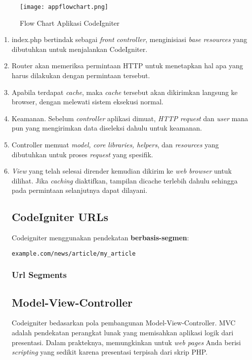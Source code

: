 \begin{figure} [H]
	\centering  
	\texttt{[image: appflowchart.png]}  
	\caption{Flow Chart Aplikasi CodeIgniter}
	\label{fig:flow-chart-CodeIgniter} 
\end{figure}

\begin{enumerate}
\item index.php bertindak sebagai \textit{front controller}, menginisiasi \textit{base resources} yang dibutuhkan untuk menjalankan CodeIgniter.
\item Router akan memeriksa permintaan HTTP untuk menetapkan hal apa yang harus dilakukan dengan permintaan tersebut.
\item Apabila terdapat \textit{cache}, maka \textit{cache} tersebut akan dikirimkan langsung ke browser, dengan melewati sistem eksekusi normal.
\item Keamanan. Sebelum \textit{controller} aplikasi dimuat, \textit{HTTP request} dan \textit{user} mana pun yang mengirimkan data diseleksi dahulu untuk keamanan.
\item Controller memuat \textit{model, core libraries, helpers}, dan \textit{resources} yang dibutuhkan untuk proses \textit{request} yang spesifik.
\item \textit{View} yang telah selesai dirender kemudian dikirim ke \textit{web browser} untuk dilihat. Jika \textit{caching} diaktifkan, tampilan dicache terlebih dahulu sehingga pada permintaan selanjutnya dapat dilayani.\citep{codeIgniter:17}

\subsection{CodeIgniter URLs}
\label{subs:urls}
Codeigniter menggunakan pendekatan \textbf{berbasis-segmen}:\cite{codeigniter:17}
\begin{lstlisting}[frame=single] 
example.com/news/article/my_article
\end{lstlisting}

\subsubsection{Url Segments}
\label{sssec:url_1}


\subsection{Model-View-Controller}
\label{subs:mvc}
Codeigniter bedasarkan pola pembangunan Model-View-Controller. MVC adalah pendekatan perangkat lunak yang memisahkan aplikasi logik dari presentasi. Dalam prakteknya, memungkinkan untuk \textit{web pages} Anda berisi \textit{scripting} yang sedikit karena presentasi terpisah dari skrip PHP.


\end{enumerate}
